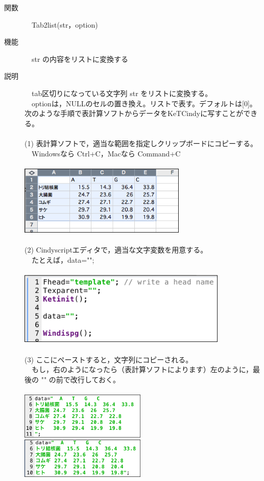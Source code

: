\documentclass[papersize,a4paper,12pt,uplatex]{jsarticle}
\begin{document}
\begin{description}
\hypertarget{tab2list}{}
\item[関数]　Tab2list(str，option)
\item[機能]　str の内容をリストに変換する
\item[説明]　tab区切りになっている文字列 str をリストに変換する。\\
　optionは，NULLのセルの置き換え。リストで表す。デフォルトは[0]。\\
次のような手順で表計算ソフトからデータをKeTCindyに写すことができる。\\
　\\
(1) 表計算ソフトで，適当な範囲を指定しクリップボードにコピーする。\\
　Windowsなら Ctrl+C，Macなら Command+C\\
　\\
\includegraphics[bb=0 0 742 308 , width=8cm]{Fig/tab2list01.png}\\
　\\
(2) Cindyscriptエディタで，適当な文字変数を用意する。\\
　たとえば，data="";\\
　\\
\includegraphics[bb=0 0 858 298 , width=10cm]{Fig/tab2list02.png}\\
　\\
(3) ここにペーストすると，文字列にコピーされる。\\
　もし，右のようになったら（表計算ソフトによります）左のように，最後の "" の前で改行しておく。\\
　\\
\includegraphics[bb=0 0 748 276 , width=6cm]{Fig/tab2list001.png}　\includegraphics[bb=0 0 738 236 , width=6cm]{Fig/tab2list00.png}\\


\end{description}
\end{document}
